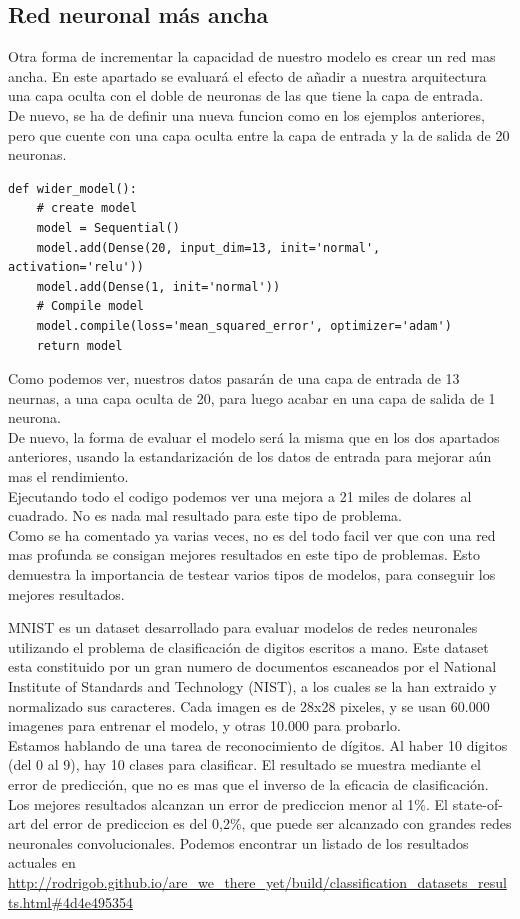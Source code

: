 \subsection{Red neuronal más ancha}
Otra forma de incrementar la capacidad de nuestro modelo es crear un red mas ancha. En este apartado se evaluará el efecto de añadir a nuestra arquitectura una capa oculta con el doble de neuronas de las que tiene la capa de entrada.\\
De nuevo, se ha de definir una nueva funcion como en los ejemplos anteriores, pero que cuente con una capa oculta entre la capa de entrada y la de salida de 20 neuronas.
\begin{verbatim}
def wider_model():
	# create model
	model = Sequential()
	model.add(Dense(20, input_dim=13, init='normal', activation='relu'))
	model.add(Dense(1, init='normal'))
	# Compile model
	model.compile(loss='mean_squared_error', optimizer='adam')
	return model
\end{verbatim}
Como podemos ver, nuestros datos pasarán de una capa de entrada de 13 neurnas, a una capa oculta de 20, para luego acabar en una capa de salida de 1 neurona.\\
De nuevo, la forma de evaluar el modelo será la misma que en los dos apartados anteriores, usando la estandarización de los datos de entrada para mejorar aún mas el rendimiento.\\
Ejecutando todo el codigo podemos ver una mejora a 21 miles de dolares al cuadrado. No es nada mal resultado para este tipo de problema.\\
Como se ha comentado ya varias veces, no es del todo facil ver que con una red mas profunda se consigan mejores resultados en este tipo de problemas. Esto demuestra la importancia de testear varios tipos de modelos, para conseguir los mejores resultados.

MNIST es un dataset desarrollado para evaluar modelos de redes neuronales utilizando el problema de clasificación de digitos escritos a mano. Este dataset esta constituido por un gran numero de documentos escaneados por el National Institute of Standards and Technology (NIST), a los cuales se la han extraido y normalizado sus caracteres. Cada imagen es de 28x28 pixeles, y se usan 60.000 imagenes para entrenar el modelo, y otras 10.000 para probarlo.\\
Estamos hablando de una tarea de reconocimiento de dígitos. Al haber 10 digitos (del 0 al 9), hay 10 clases para clasificar. El resultado se muestra mediante el error de predicción, que no es mas que el inverso de la eficacia de clasificación.\\
Los mejores resultados alcanzan un error de prediccion menor al 1\%. El state-of-art del error de prediccion es del 0,2\%, que puede ser alcanzado con grandes redes neuronales convolucionales. Podemos encontrar un listado de los resultados actuales en \url{http://rodrigob.github.io/are_we_there_yet/build/classification_datasets_results.html#4d4e495354}\\
